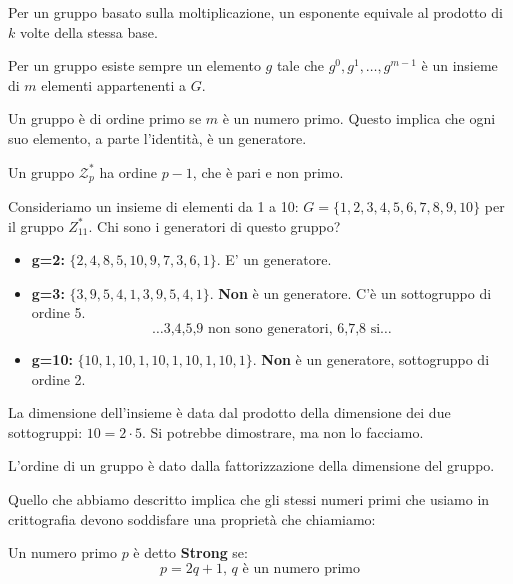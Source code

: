 Per un gruppo basato sulla moltiplicazione, un esponente equivale al prodotto di $k$ volte della stessa base. 
\begin{definition}
Per un gruppo esiste sempre un elemento $g$ tale che ${g^0,g^1,\dots,g^{m-1}}$ è un insieme di $m$ elementi appartenenti a $G$.\\
\begin{property}
Un gruppo è di ordine primo se $m$ è un numero primo. Questo implica che ogni suo elemento, a parte l'identità, è un generatore.
\end{property}
\begin{remark}
Un gruppo $\mathcal{Z}_p^*$ ha ordine $p-1$, che è pari e non primo.
\end{remark}
\end{definition}
\begin{example}[ $Z_{11}^*$]
Consideriamo un insieme di elementi da 1 a 10: $G=\{1,2,3,4,5,6,7,8,9,10\}$ per il gruppo $Z_{11}^*$. Chi sono i generatori di questo gruppo?
\begin{itemize}
    \item \textbf{g=2:} $\{2,4,8,5,10,9,7,3,6,1\}$. E' un generatore.
    \item \textbf{g=3:} $\{3,9,5,4,1,3,9,5,4,1\}$. \textbf{Non} è un generatore. C'è un sottogruppo di ordine 5.
    \[\dots \text{3,4,5,9 non sono generatori, 6,7,8 si}\dots\]
    \item \textbf{g=10:} $\{10,1,10,1,10,1,10,1,10,1\}$. \textbf{Non} è un generatore, sottogruppo di ordine 2.
\end{itemize}
\begin{note}
La dimensione dell'insieme è data dal prodotto della dimensione dei due sottogruppi: $10=2\cdot5$. Si potrebbe dimostrare, ma non lo facciamo.
\end{note}
\label{exam:grouporder}
\end{example}
\begin{theorem}
L'ordine di un gruppo è dato dalla fattorizzazione della dimensione del gruppo.
\end{theorem}
Quello che abbiamo descritto implica che gli stessi numeri primi che usiamo in crittografia devono soddisfare una proprietà che chiamiamo:
\begin{definition}
Un numero primo $p$ è detto \textbf{Strong} se:
\begin{equation}\label{eq:strongp}
    p=2q+1,\,q\text{ è un numero primo}
\end{equation}
\end{definition}
